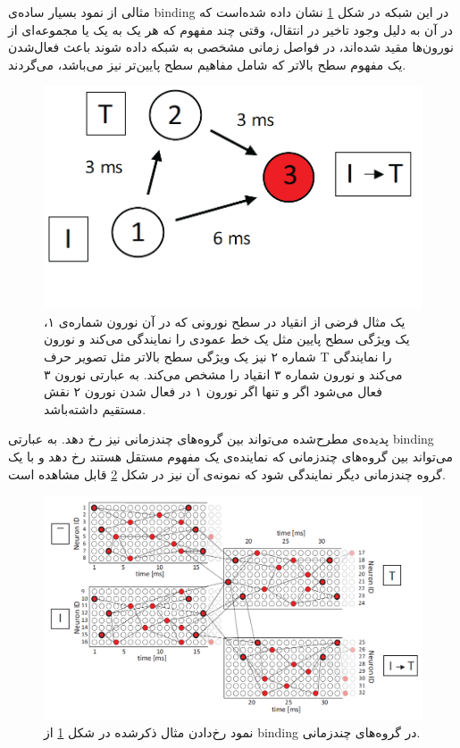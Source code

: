 \documentclass[12pt]{report}
\begin{document}
	مثالی از نمود بسیار ساده‌ی \gls{binding} در این شبکه در شکل \ref{fig:eguchi-binding} نشان داده شده‌است که در آن به دلیل وجود تاخیر در انتقال، وقتی چند مفهوم که هر یک به یک یا مجموعه‌ای از نورون‌ها مقید‌ شده‌اند، در فواصل زمانی مشخصی به شبکه داده شوند باعث فعال‌شدن یک مفهوم سطح بالاتر که شامل مفاهیم سطح پایین‌تر نیز می‌باشد، می‌گردند. 
	
	\begin{figure}[H]
		\centering
		\includegraphics[width=0.7\linewidth]{poly-bind.png}
		\caption[NS]{
			یک مثال فرضی از انقیاد در سطح نورونی که در آن نورون شماره‌ی ۱، یک ویژگی سطح پایین مثل یک خط عمودی را نمایندگی می‌کند و نورون شماره ۲ نیز یک ویژگی سطح بالاتر مثل تصویر حرف T را نمایندگی می‌کند و نورون شماره ۳ انقیاد را مشخص می‌کند. به عبارتی نورون ۳ فعال می‌شود اگر و تنها اگر نورون ۱ در فعال شدن نورون ۲ نقش مستقیم داشته‌باشد.
		}
		\label{fig:eguchi-binding}
	\end{figure}
	
	پدیده‌ی مطرح‌شده می‌تواند بین گروه‌های چندزمانی نیز رخ دهد. به عبارتی \gls{binding} می‌تواند بین گروه‌های چندزمانی که نماینده‌ی یک مفهوم مستقل هستند رخ دهد و با یک گروه چندزمانی دیگر نمایندگی شود که نمونه‌ی آن نیز در شکل \ref{fig:eguchi-binding-group} قابل مشاهده است.
	
	\begin{figure}[H]
		\centering
		\includegraphics[width=0.7\linewidth]{poly-group-bind.png}
		\caption[NS]{
			نمود رخ‌دادن مثال ذکر‌شده در شکل \ref{fig:eguchi-binding}  از \gls{binding} در گروه‌های چند‌زمانی.
		}
		\label{fig:eguchi-binding-group}
	\end{figure}
	
\end{document}
